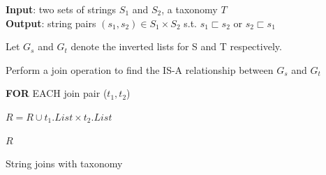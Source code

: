 \documentclass{sig-alternate}
\begin{document}


\begin{algorithm}
{\bf Input}: two sets of strings $S_1$ and $S_2$, a taxonomy $T$ \\
{\bf Output}: string pairs $(s_1,s_2) \in S_1 \times S_2$ s.t. $s_1 \sqsubset s_2$ or $s_2 \sqsubset s_1$
\begin{compactenum}[(1)]
\item Let $G_s$ and $G_t$ denote the inverted lists for S and T respectively.
\item Perform a join operation to find the IS-A relationship between $G_s$ and $G_t$
\item {\bf FOR} EACH join pair ($t_1,t_2$)
\item  $R = R \cup t_1.List \times t_2.List$
\item $R$
\end{compactenum}
\caption{String joins with taxonomy}
\label{alg:exactjoin}
\end{algorithm}
\end{document}
